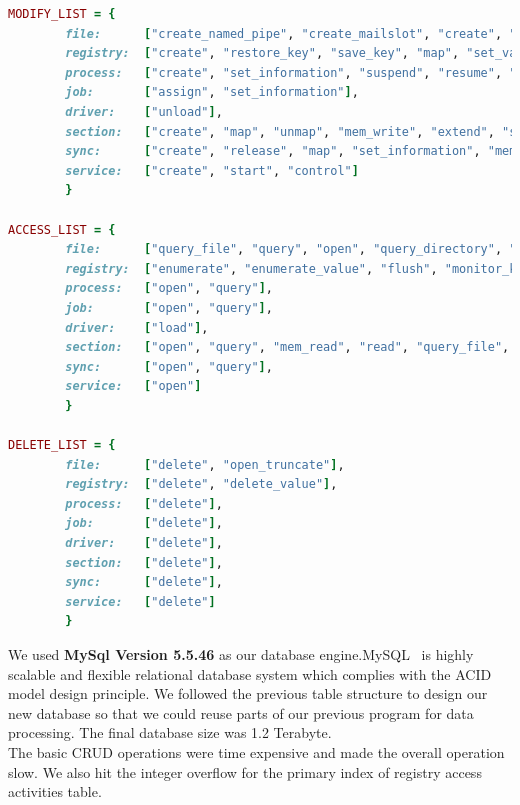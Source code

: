 \begin{lstlisting}[language=ruby,caption={Mapping of generalize system calls with regard to behavioral profile },label={lbl:ntapi}]
MODIFY_LIST = {
        file:      ["create_named_pipe", "create_mailslot", "create", "rename", "lock", "set_information", "write", "unlock", "flush_buffer", "suspend", "map", "resume"],
        registry:  ["create", "restore_key", "save_key", "map", "set_value", "set_information", "compress_key", "lock", "resume", "suspend", "mem_write"],
        process:   ["create", "set_information", "suspend", "resume", "unmap", "map"],
        job:       ["assign", "set_information"],
        driver:    ["unload"],
        section:   ["create", "map", "unmap", "mem_write", "extend", "suspend", "resume", "set_information", "release"],
        sync:      ["create", "release", "map", "set_information", "mem_write"],
        service:   ["create", "start", "control"]
        }

ACCESS_LIST = {
        file:      ["query_file", "query", "open", "query_directory", "query_information", "read", "monitor_dir", "control", "device_control", "fs_control", "query_value"],
        registry:  ["enumerate", "enumerate_value", "flush", "monitor_key", "open", "query", "query_value", "mem_read"],
        process:   ["open", "query"],
        job:       ["open", "query"],
        driver:    ["load"],
        section:   ["open", "query", "mem_read", "read", "query_file", "query_system"],
        sync:      ["open", "query"],
        service:   ["open"]
        }

DELETE_LIST = {
        file:      ["delete", "open_truncate"],
        registry:  ["delete", "delete_value"],
        process:   ["delete"],
        job:       ["delete"],
        driver:    ["delete"],
        section:   ["delete"],
        sync:      ["delete"],
        service:   ["delete"]
        }

\end{lstlisting}
We used \textbf{MySql Version 5.5.46} as our database engine.MySQL~\cite[]{mysql} is highly scalable and flexible relational database system which complies with the ACID model design principle.
We followed the previous table structure to design our new database so that we could reuse parts of our previous program for data processing.
The final database size was 1.2 Terabyte.\\
The basic CRUD operations were time expensive and made the overall operation slow.
We also hit the integer overflow for the primary index of registry access activities table.
